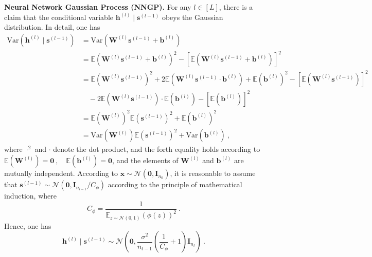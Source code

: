 \documentclass[review,10pt]{JMtemplate}
\begin{document}
\vspace{0.2 cm}
\noindent\textbf{Neural Network Gaussian Process (NNGP).} For any $l \in [L]$, there is a claim that the conditional variable $\boldsymbol{h}^{(l)} \mid 	\boldsymbol{s}^{(l-1)}$ obeys the Gaussian distribution. In detail, one has
\[
\begin{aligned}
	\textrm{Var} \left( \boldsymbol{h}^{(l)} \mid	\boldsymbol{s}^{(l-1)} \right) 
	&=  \textrm{Var} \left( \mathbf{W}^{(l)} \boldsymbol{s}^{(l-1)} + \boldsymbol{b}^{(l)}  \right)  \\
	&= \mathbb{E} \left(  \mathbf{W}^{(l)} \boldsymbol{s}^{(l-1)} + \boldsymbol{b}^{(l)} \right)^2 - \left[ \mathbb{E} \left( \mathbf{W}^{(l)} \boldsymbol{s}^{(l-1)} + \boldsymbol{b}^{(l)} \right) \right] ^2 \\
	&= \mathbb{E}  \left( \mathbf{W}^{(l)} \boldsymbol{s}^{(l-1)}  \right)^2 + 2  \mathbb{E}  \left( \mathbf{W}^{(l)} \boldsymbol{s}^{(l-1)} \cdot \boldsymbol{b}^{(l)} \right) + \mathbb{E}  \left( \boldsymbol{b}^{(l)} \right)^2 - \left[  \mathbb{E} \left( \mathbf{W}^{(l)} \boldsymbol{s}^{(l-1)} \right) \right]^2 \\
	&\quad - 2 \mathbb{E} \left( \mathbf{W}^{(l)} \boldsymbol{s}^{(l-1)} \right) \cdot \mathbb{E} \left( \boldsymbol{b}^{(l)} \right) - \left[  \mathbb{E} \left( \boldsymbol{b}^{(l)} \right) \right]^2 \\
	&= \mathbb{E}  \left( \mathbf{W}^{(l)} \right)^2   \mathbb{E}  \left(  \boldsymbol{s}^{(l-1)} \right)^2 + \mathbb{E}\left( \boldsymbol{b}^{(l)} \right)^2 \\
	&= \textrm{Var} \left(  \mathbf{W}^{(l)} \right) \mathbb{E} \left( \boldsymbol{s}^{(l-1)} \right)^2 + \textrm{Var} \left(  \boldsymbol{b}^{(l)} \right) \ ,
\end{aligned}
\]
where $\cdot^2$ and $\cdot$ denote the dot product, and the forth equality holds according to $\mathbb{E}  ( \mathbf{W}^{(l)} ) = \mathbf{0} \ , \quad \mathbb{E}( \boldsymbol{b}^{(l)} ) = \boldsymbol{0} $, and the elements of $\mathbf{W}^{(l)}$ and $\boldsymbol{b}^{(l)}$ are mutually independent. According to $\boldsymbol{x} \sim \mathcal{N}(\boldsymbol{0}, \mathbf{I}_{n_0})$, it is reasonable to assume that $\boldsymbol{s}^{(l-1)} \sim \mathcal{N}(\boldsymbol{0}, \mathbf{I}_{n_{l-1}} / C_{\phi})$ according to the principle of mathematical induction, where 
\[
C_{\phi} = \frac{1}{\mathbb{E}_{z \sim \mathcal{N}(0,1)} \left( \phi(z) \right)^2   }  \ .
\]
Hence, one has
\[
\boldsymbol{h}^{(l)} \mid	\boldsymbol{s}^{(l-1)}  \sim \mathcal{N} \left(  \boldsymbol{0}, \frac{\sigma^2}{n_{l-1}} \left( \frac{1}{C_{\phi}} + 1 \right) \mathbf{I}_{n_l} \right) \ .
\]
\end{document}
